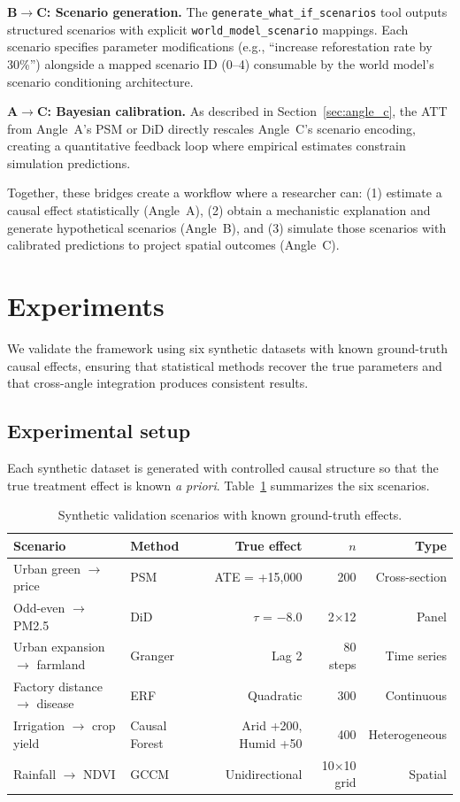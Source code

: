 \documentclass{article}
\begin{document}
\textbf{B$\to$C: Scenario generation.} The \texttt{generate\_what\_if\_scenarios} tool outputs structured scenarios with explicit \texttt{world\_model\_scenario} mappings. Each scenario specifies parameter modifications (e.g., ``increase reforestation rate by 30\%'') alongside a mapped scenario ID (0--4) consumable by the world model's scenario conditioning architecture.

\textbf{A$\to$C: Bayesian calibration.} As described in Section~\ref{sec:angle_c}, the ATT from Angle~A's PSM or DiD directly rescales Angle~C's scenario encoding, creating a quantitative feedback loop where empirical estimates constrain simulation predictions.

Together, these bridges create a workflow where a researcher can: (1) estimate a causal effect statistically (Angle~A), (2) obtain a mechanistic explanation and generate hypothetical scenarios (Angle~B), and (3) simulate those scenarios with calibrated predictions to project spatial outcomes (Angle~C).


\section{Experiments}
\label{sec:experiments}

We validate the framework using six synthetic datasets with known ground-truth causal effects, ensuring that statistical methods recover the true parameters and that cross-angle integration produces consistent results.

\subsection{Experimental setup}

Each synthetic dataset is generated with controlled causal structure so that the true treatment effect is known \textit{a priori}. Table~\ref{tab:experiments} summarizes the six scenarios.

\begin{table}[htbp]
\centering
\caption{Synthetic validation scenarios with known ground-truth effects.}
\label{tab:experiments}
\begin{tabular}{llrrr}
\toprule
Scenario & Method & True effect & $n$ & Type \\
\midrule
Urban green $\to$ price & PSM & ATE = +15{,}000 & 200 & Cross-section \\
Odd-even $\to$ PM2.5 & DiD & $\tau$ = $-8.0$ & 2$\times$12 & Panel \\
Urban expansion $\to$ farmland & Granger & Lag 2 & 80 steps & Time series \\
Factory distance $\to$ disease & ERF & Quadratic & 300 & Continuous \\
Irrigation $\to$ crop yield & Causal Forest & Arid +200, Humid +50 & 400 & Heterogeneous \\
Rainfall $\to$ NDVI & GCCM & Unidirectional & 10$\times$10 grid & Spatial \\
\bottomrule
\end{tabular}
\end{table}
\end{document}
